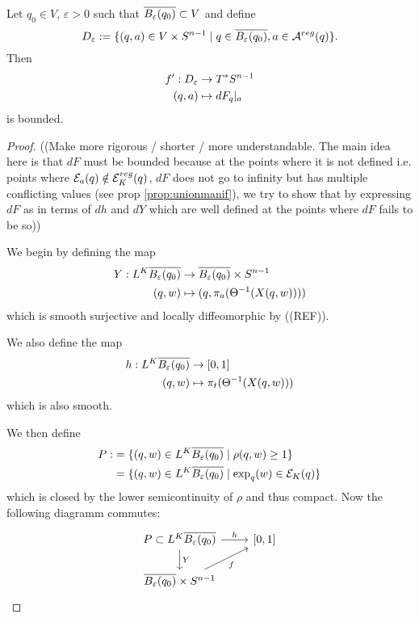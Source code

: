 \begin{proposition}\label{prop:dfbounded}
    Let $q_0\in V$, $\varepsilon>0$ such that ${\overline{B_\varepsilon(q_0)}}\subset V$ and define 
    \[
        D_\varepsilon:=\{(q,a)\in V\times {S^{n-1}} \mid q\in {\overline{B_\varepsilon(q_0)}}, a\in {{\mathcal{A}}^{reg}}(q)\}.
    \]
    Then 
    \begin{align*}
        f':D_\varepsilon &\to T^*{S^{n-1}} \\
        (q,a)&\mapsto dF_q\rvert_a
    \end{align*}
    is bounded.
\end{proposition}
\begin{proof}
    ((Make more rigorous / shorter / more understandable. The main idea here is that $dF$ must be bounded because at the points where it is not defined i.e. points where ${\mathcal{E}}_a(q)\notin {{\mathcal{E}}^{reg}_K}(q)$, $dF$ does not go to infinity but has multiple conflicting values (see prop \ref{prop:unionmanif}), we try to show that by expressing $dF$ as in terms of $dh$ and $dY$ which are well defined at the points where $dF$ fails to be so))

    We begin by defining the map
    \begin{align*}
        Y:L^K{\overline{B_\varepsilon(q_0)}}&\to {\overline{B_\varepsilon(q_0)}}\times {S^{n-1}} \\
        (q,w)&\mapsto (q,\pi_a(\Theta^{-1}(X(q,w))))
    \end{align*} which is smooth surjective and locally diffeomorphic by ((REF)).

    We also define the map
    \begin{align*}
        h:L^K{\overline{B_\varepsilon(q_0)}}&\to [0,1] \\
        (q,w)&\mapsto \pi_t(\Theta^{-1}(X(q,w)))
    \end{align*} which is also smooth.

    We then define 
    \begin{align*}
        P:&= \{(q,w)\in L^K{\overline{B_\varepsilon(q_0)}} \mid \rho(q,w)\ge 1\}\\
        &= \{(q,w)\in L^K{\overline{B_\varepsilon(q_0)}} \mid \exp_q(w)\in {{\mathcal{E}}_K}(q)\}
    \end{align*} which is closed by the lower semicontinuity of $\rho$ and thus compact.
    Now the following diagramm commutes:
    \[\begin{tikzcd}
        {P\subset L^K\cl{B_\varepsilon(q_0)}} & {[0,1]} \\
        {\cl{B_\varepsilon(q_0)}\times S^{n-1}}
        \arrow["Y", from=1-1, to=2-1]
        \arrow["h", from=1-1, to=1-2]
        \arrow["f"', from=2-1, to=1-2]
    \end{tikzcd}\]


\end{proof}
